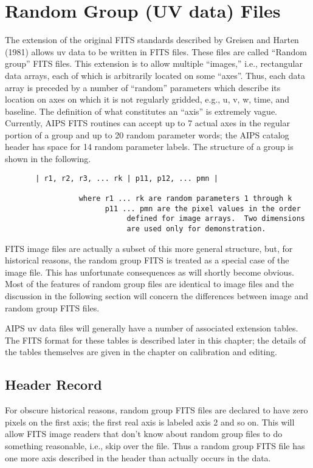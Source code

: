 \section{Random Group (UV data) Files}
The extension of the original FITS standards described by Greisen and
Harten (1981) allows uv data to be written in FITS files. These files
are called ``Random group'' FITS files. This extension is to allow
multiple ``images,'' i.e., rectangular data arrays, each of which is
arbitrarily located on some ``axes''.  Thus, each data array is preceded
by a number of ``random'' parameters which describe its location on axes
on which it is not regularly gridded, e.g., u, v, w, time, and
baseline. The definition of what constitutes an ``axis'' is extremely
vague.  Currently, AIPS FITS routines can accept up to 7 actual axes
in the regular portion of a group and up to 20 random parameter words;
the AIPS catalog header has space for 14 random parameter labels.
The structure of a group is shown in the following.

\begin{verbatim}
       | r1, r2, r3, ... rk | p11, p12, ... pmn |

                 where r1 ... rk are random parameters 1 through k
                       p11 ... pmn are the pixel values in the order
                            defined for image arrays.  Two dimensions
                            are used only for demonstration.

\end{verbatim}
FITS image files are actually a subset of this more general structure,
but, for historical reasons, the random group FITS is treated as a
special case of the image file.  This has unfortunate consequences as
will shortly become obvious.  Most of the features of random group
files are identical to image files and the discussion in the following
section will concern the differences between image and random group
FITS files.

AIPS uv data files will generally have a number of associated
extension tables.  The FITS format for these tables is described later
in this chapter; the details of the tables themselves are given in the
chapter on calibration and editing.

\subsection{Header Record }
For obscure historical reasons, random group FITS files are declared
to have zero pixels on the first axis; the first real axis is labeled
axis 2 and so on. This will allow FITS image readers that don't know
about random group files to do something reasonable, i.e., skip over
the file.  Thus a random group FITS file has one more axis described
in the header than actually occurs in the data.

